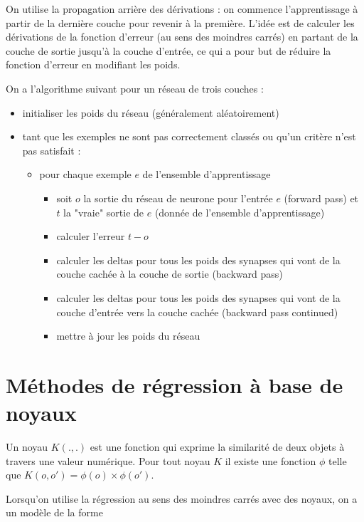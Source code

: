 	On utilise la propagation arrière des dérivations : on commence l'apprentissage à partir de la dernière couche pour revenir à la première. L'idée est de calculer les dérivations de la fonction d'erreur (au sens des moindres carrés) en partant de la couche de sortie jusqu'à la couche d'entrée, ce qui a pour but de réduire la fonction d'erreur en modifiant les poids.
	
	On a l'algorithme suivant pour un réseau de trois couches : %
	
	\begin{itemize}
		\item initialiser les poids du réseau (généralement aléatoirement)
		\item tant que les exemples ne sont pas correctement classés ou qu'un critère n'est pas satisfait :
		
		\begin{itemize}
			\item pour chaque exemple $e$ de l'ensemble d'apprentissage
				\begin{itemize}
					\item soit $o$ la sortie du réseau de neurone pour l'entrée $e$ (forward pass) et $t$ la "vraie" sortie de $e$ (donnée de l'ensemble d'apprentissage)
					\item calculer l'erreur $t - o$
					\item calculer les deltas pour tous les poids des synapses qui vont de la couche cachée à la couche de sortie (backward pass)
					\item calculer les deltas pour tous les poids des synapses qui vont de la couche d'entrée vers la couche cachée (backward pass continued)
					\item mettre à jour les poids du réseau
				\end{itemize}
		\end{itemize}
	\end{itemize}
	
	
\section{Méthodes de régression à base de noyaux}
	
Un noyau $K(., .)$ est une fonction qui exprime la similarité de deux objets à travers une valeur numérique. Pour tout noyau $K$ il existe une fonction $\phi$ telle que $K(o, o') = \phi(o) \times \phi(o')$.

Lorsqu'on utilise la régression au sens des moindres carrés avec des noyaux, on a un modèle de la forme

